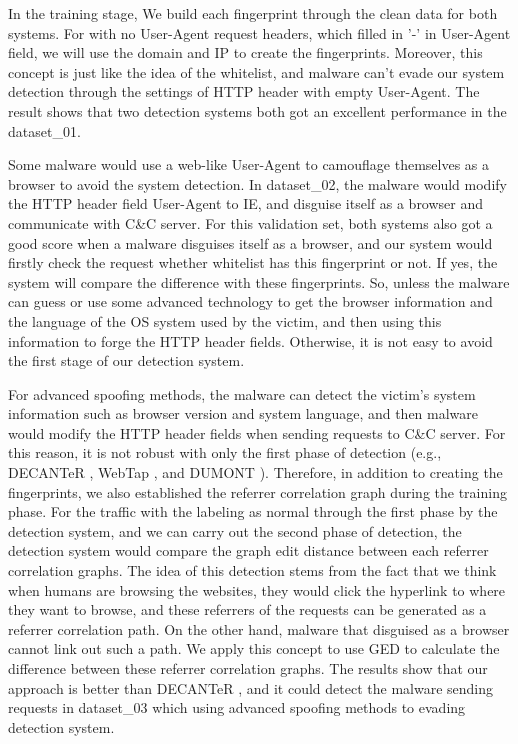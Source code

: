In the training stage, We build each fingerprint through the clean data for both systems. For with no User-Agent request headers, which filled in '-' in User-Agent field, we will use the domain and IP to create the fingerprints. Moreover, this concept is just like the idea of the whitelist, and malware can't evade our system detection through the settings of HTTP header with empty User-Agent. The result shows that two detection systems both got an excellent performance in the dataset\_01.

Some malware would use a web-like User-Agent to camouflage themselves as a browser to avoid the system detection. In dataset\_02, the malware would modify the HTTP header field User-Agent to IE, and disguise itself as a browser and communicate with C\&C server. For this validation set, both systems also got a good score when a malware disguises itself as a browser, and our system would firstly check the request whether whitelist has this fingerprint or not. If yes, the system will compare the difference with these fingerprints. So, unless the malware can guess or use some advanced technology to get the browser information and the language of the OS system used by the victim, and then using this information to forge the HTTP header fields. Otherwise, it is not easy to avoid the first stage of our detection system.

For advanced spoofing methods, the malware can detect the victim's system information such as browser version and system language, and then malware would modify the HTTP header fields when sending requests to C\&C server. For this reason, it is not robust with only the first phase of detection (e.g., DECANTeR \cite{bortolameotti2017decanter}, WebTap \cite{borders2004web}, and DUMONT \cite{schwenk2011adaptive}). Therefore, in addition to creating the fingerprints, we also established the referrer correlation graph during the training phase. For the traffic with the labeling as normal through the first phase by the detection system, and we can carry out the second phase of detection, the detection system would compare the graph edit distance between each referrer correlation graphs. The idea of this detection stems from the fact that we think when humans are browsing the websites, they would click the hyperlink to where they want to browse, and these referrers of the requests can be generated as a referrer correlation path. On the other hand, malware that disguised as a browser cannot link out such a path. We apply this concept to use GED to calculate the difference between these referrer correlation graphs. The results show that our approach is better than DECANTeR \cite{bortolameotti2017decanter}, and it could detect the malware sending requests in dataset\_03 which using advanced spoofing methods to evading detection system.


